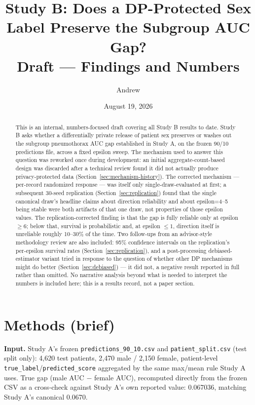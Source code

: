\documentclass[11pt]{article}
\title{Study B: Does a DP-Protected Sex Label Preserve the Subgroup AUC Gap? \\ \large Draft --- Findings and Numbers}
\author{Andrew}
\date{August 19, 2026}
\begin{document}
\maketitle

\begin{abstract}
\noindent This is an internal, numbers-focused draft covering all Study B results to date. Study B asks whether a differentially private release of patient sex preserves or washes out the subgroup pneumothorax AUC gap established in Study A, on the frozen 90/10 predictions file, across a fixed epsilon sweep. The mechanism used to answer this question was reworked once during development: an initial aggregate-count-based design was discarded after a technical review found it did not actually produce privacy-protected data (Section~\ref{sec:mechanism-history}). The corrected mechanism --- per-record randomized response --- was itself only single-draw-evaluated at first; a subsequent 30-seed replication (Section~\ref{sec:replication}) found that the single canonical draw's headline claims about direction reliability and about epsilon=4--5 being stable were both artifacts of that one draw, not properties of those epsilon values. The replication-corrected finding is that the gap is fully reliable only at epsilon $\geq6$; below that, survival is probabilistic and, at epsilon $\leq1$, direction itself is unreliable roughly 10--30\% of the time. Two follow-ups from an advisor-style methodology review are also included: 95\% confidence intervals on the replication's per-epsilon survival rates (Section~\ref{sec:replication}), and a post-processing debiased-estimator variant tried in response to the question of whether other DP mechanisms might do better (Section~\ref{sec:debiased}) --- it did not, a negative result reported in full rather than omitted. No narrative analysis beyond what is needed to interpret the numbers is included here; this is a results record, not a paper section.
\end{abstract}

\section{Methods (brief)}

\textbf{Input.} Study A's frozen \texttt{predictions\_90\_10.csv} and \texttt{patient\_split.csv} (test split only): 4{,}620 test patients, 2{,}470 male / 2{,}150 female, patient-level \texttt{true\_label}/\texttt{predicted\_score} aggregated by the same max/mean rule Study A uses. True gap (male AUC $-$ female AUC), recomputed directly from the frozen CSV as a cross-check against Study A's own reported value: 0.067036, matching Study A's canonical 0.0670.
\end{document}
